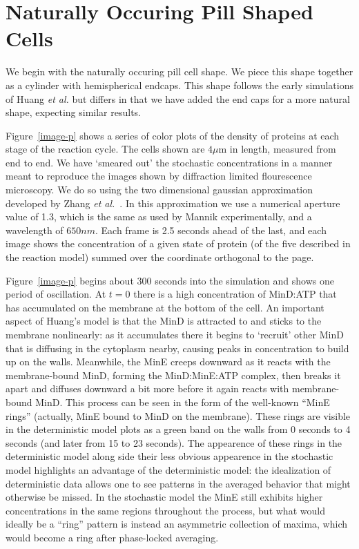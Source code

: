 \documentclass[letterpaper,twocolumn,amsmath,amssymb,pre]{revtex4-1}
\newcommand\micron{\ensuremath{\mu\text{m}}}
\begin{document}
\section{Naturally Occuring Pill Shaped Cells}

We begin with the naturally occuring pill cell shape.  We piece this
shape together as a cylinder with hemispherical endcaps.  This shape
follows the early simulations of Huang \emph{et al.} but differs in
that we have added the end caps for a more natural shape, expecting
similar results.

Figure~\ref{image-p} shows a series of color plots of the density of
proteins at each stage of the reaction cycle. The cells shown are
$4\micron$ in length, measured from end to end.  We have `smeared out'
the stochastic concentrations in a manner meant to reproduce the
images shown by diffraction limited flourescence microscopy.  We do so
using the two dimensional gaussian approximation developed by Zhang
\emph{et al.}~\cite{zhang2007gaussian}.  In this approximation we use
a numerical aperture value of 1.3, which is the same as used by Mannik
experimentally, and a wavelength of $650nm$.  Each frame is 2.5
seconds ahead of the last, and each image shows the concentration of a
given state of protein (of the five described in the reaction model)
summed over the coordinate orthogonal to the page.

Figure~\ref{image-p} begins about 300 seconds into the simulation and
shows one period of oscillation.  At $t=0$ there is a high
concentration of MinD:ATP that has accumulated on the membrane at the
bottom of the cell. An important aspect of Huang's model is that the
MinD is attracted to and sticks to the membrane nonlinearly: as it
accumulates there it begins to `recruit' other MinD that is diffusing
in the cytoplasm nearby, causing peaks in concentration to build up on
the walls.  Meanwhile, the MinE creeps downward as it reacts with the
membrane-bound MinD, forming the MinD:MinE:ATP complex, then breaks it
apart and diffuses downward a bit more before it again reacts with
membrane-bound MinD.  This process can be seen in the form of the
well-known ``MinE rings'' (actually, MinE bound to MinD on the
membrane).  These rings are visible in the deterministic model plots
as a green band on the walls from 0 seconds to 4 seconds (and later
from 15 to 23 seconds).  The appearence of these rings in the
deterministic model along side their less obvious appearence in the
stochastic model highlights an advantage of the deterministic model:
the idealization of deterministic data allows one to see patterns in
the averaged behavior that might otherwise be missed.  In the
stochastic model the MinE still exhibits higher concentrations in the
same regions throughout the process, but what would ideally be a
``ring'' pattern is instead an asymmetric collection of maxima, which
would become a ring after phase-locked averaging.
\end{document}
